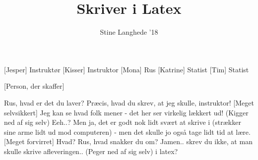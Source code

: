 \documentclass[a4paper,11pt]{article}
\title{Skriver i Latex}
\author{Stine Langhede '18}
\begin{document}
\maketitle

\begin{roles}
[Jesper] Instruktør
[Kisser] Instruktor
[Mona] Rus
[Katrine] Statist
[Tim] Statist
\end{roles}

\begin{props}
[Person, der skaffer]
\end{props}


\begin{sketch}



 Rus, hvad er det du laver?
 Præcis, hvad du skrev, at jeg skulle, instruktor! 
[Meget selvsikkert] Jeg kan se hvad folk mener - det her ser virkelig lækkert ud! (Kigger ned af sig selv)
 Eeh..?
 Men ja, det er godt nok lidt svært at skrive i (strækker sine arme lidt ud mod computeren) - men det skulle jo også tage lidt tid at lære.
 [Meget forvirret] Hvad? Rus, hvad snakker du om?
 Jamen.. skrev du ikke, at man skulle skrive afleveringen.. (Peger ned af sig selv) i latex? 

\end{sketch}
\end{document}
